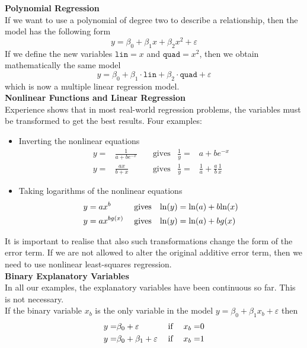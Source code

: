 \textbf{Polynomial Regression}\\
If we want to use a polynomial of degree two to describe a relationship, then the model has the following form
\begin{equation}
  y = \beta_0 + \beta_1x + \beta_2 x^2 + \varepsilon
\end{equation}
If we define the new variables $\texttt{lin} = x$ and $\texttt{quad} = x^2$, then we obtain mathematically the same model
\begin{equation}
  y = \beta_0 + \beta_1 \cdot \texttt{lin} + \beta_2 \cdot \texttt{quad} + \varepsilon
\end{equation}
which is now a multiple linear regression model.\\

\textbf{Nonlinear Functions and Linear Regression}\\
Experience shows that in most real-world regression problems, the variables must be transformed to get the best results. Four examples:
\begin{itemize}
  \item Inverting the nonlinear equations
  \begin{align*}
    y =& \frac{1}{a+be^{-x}}  &  \;&\text{gives} & \frac{1}{y} =& a + be^{-x}\\
    y =& \frac{ax}{b+x}       &  \;&\text{gives} & \frac{1}{y} =& \frac{1}{a} + \frac{a}{b} \frac{1}{x}
  \end{align*}
  \item Taking logarithms of the nonlinear equations
  \begin{align*}
    y &= ax^b       & \;&\text{gives} & \textup{ln}(y) &= \textup{ln}(a) + b\textup{ln}(x)\\
    y &= ax^{bg(x)} & \;&\text{gives} & \textup{ln}(y) &= \textup{ln}(a) + bg(x)
  \end{align*}
\end{itemize}
It is important to realise that also such transformations change the form of the error term. If we are not allowed to alter the original additive error term, then we need to use nonlinear least-squares regression.\\

\textbf{Binary Explanatory Variables}\\
In all our examples, the explanatory variables have been continuous so far. This is not necessary.\\
If the binary variable $x_b$ is the only variable in the model $y = \beta_0 + \beta_1 x_b + \varepsilon$ then
\begin{align*}
  y =& \beta_0 + \varepsilon           & \;&\textup{if}\; & x_b =& 0\\
  y =& \beta_0 + \beta_1 + \varepsilon & \;&\textup{if}\; & x_b =& 1
\end{align*}


